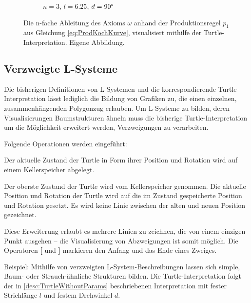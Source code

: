 \begin{figure} [hbtp]
\begin{subfigure}[t]{.3\textwidth}
		\caption{$n=3$, $l=6.25$, $d=90\degree$}
		\label{fig:KochkurveN3L6_25}
	\end{subfigure}
	\caption{Die n-fache Ableitung des Axioms $\omega$ anhand der Produktionsregel $p_1$ aus Gleichung \ref{eq:ProdKochKurve}, visualisiert mithilfe der Turtle-Interpretation. Eigene Abbildung.}
	\label{fig:KochkurveAbleitung}
\end{figure}

\subsection{Verzweigte L-Systeme}

Die bisherigen Definitionen von L-Systemen und die korrespondierende Turtle-Interpretation lässt lediglich die Bildung von Grafiken zu, die einen einzelnen, zusammenhängenden Polygonzug erlauben. Um L-Systeme zu bilden, deren Visualisierungen Baumstrukturen ähneln muss die bisherige Turtle-Interpretation um die Möglichkeit erweitert werden, Verzweigungen zu verarbeiten. \cite[S.24]{ABOP:04} 

Folgende Operationen werden eingeführt:

\begin{description}[labelindent]
	\item[\textbf{[}] Der aktuelle Zustand der Turtle in Form ihrer Position und Rotation wird auf einem Kellerspeicher abgelegt. \\
	
	\item[\textbf{]}] Der oberste Zustand der Turtle wird vom Kellerspeicher genommen. Die aktuelle Position und Rotation der Turtle wird auf die im Zustand gespeicherte Position und Rotation gesetzt. Es wird keine Linie zwischen der alten und neuen Position gezeichnet.
\end{description}
	\cite[S.24]{ABOP:04} 

Diese Erweiterung erlaubt es mehrere Linien zu zeichnen, die von einem einzigen Punkt ausgehen -- die Visualisierung von Abzweigungen ist somit möglich. Die Operatoren \textbf{[} und \textbf{]} markieren den Anfang und das Ende eines Zweiges.

Beispiel: Mithilfe von verzweigten L-System-Beschreibungen lassen sich simple, Baum- oder Strauch-ähnliche Strukturen bilden. Die Turtle-Interpretation folgt der in \ref{desc:TurtleWithoutParams} beschriebenen Interpretation mit fester Strichlänge $l$ und festem Drehwinkel $d$.


